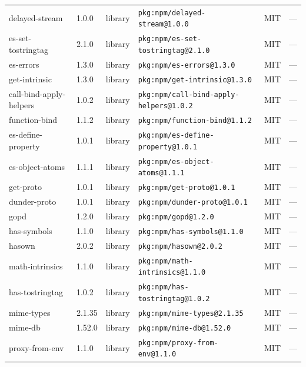 \documentclass[11pt,a4paper]{article}
\begin{document}
\begin{longtable}{|p{4cm}|p{2cm}|p{1.6cm}|p{5cm}|p{1.5cm}|p{3.5cm}|}
\raggedright delayed-stream & 1.0.0 & library & \small\texttt{pkg:npm/delayed-stream@1.0.0} & MIT & \small — \\
\raggedright es-set-tostringtag & 2.1.0 & library & \small\texttt{pkg:npm/es-set-tostringtag@2.1.0} & MIT & \small — \\
\raggedright es-errors & 1.3.0 & library & \small\texttt{pkg:npm/es-errors@1.3.0} & MIT & \small — \\
\raggedright get-intrinsic & 1.3.0 & library & \small\texttt{pkg:npm/get-intrinsic@1.3.0} & MIT & \small — \\
\raggedright call-bind-apply-helpers & 1.0.2 & library & \small\texttt{pkg:npm/call-bind-apply-helpers@1.0.2} & MIT & \small — \\
\raggedright function-bind & 1.1.2 & library & \small\texttt{pkg:npm/function-bind@1.1.2} & MIT & \small — \\
\raggedright es-define-property & 1.0.1 & library & \small\texttt{pkg:npm/es-define-property@1.0.1} & MIT & \small — \\
\raggedright es-object-atoms & 1.1.1 & library & \small\texttt{pkg:npm/es-object-atoms@1.1.1} & MIT & \small — \\
\raggedright get-proto & 1.0.1 & library & \small\texttt{pkg:npm/get-proto@1.0.1} & MIT & \small — \\
\raggedright dunder-proto & 1.0.1 & library & \small\texttt{pkg:npm/dunder-proto@1.0.1} & MIT & \small — \\
\raggedright gopd & 1.2.0 & library & \small\texttt{pkg:npm/gopd@1.2.0} & MIT & \small — \\
\raggedright has-symbols & 1.1.0 & library & \small\texttt{pkg:npm/has-symbols@1.1.0} & MIT & \small — \\
\raggedright hasown & 2.0.2 & library & \small\texttt{pkg:npm/hasown@2.0.2} & MIT & \small — \\
\raggedright math-intrinsics & 1.1.0 & library & \small\texttt{pkg:npm/math-intrinsics@1.1.0} & MIT & \small — \\
\raggedright has-tostringtag & 1.0.2 & library & \small\texttt{pkg:npm/has-tostringtag@1.0.2} & MIT & \small — \\
\raggedright mime-types & 2.1.35 & library & \small\texttt{pkg:npm/mime-types@2.1.35} & MIT & \small — \\
\raggedright mime-db & 1.52.0 & library & \small\texttt{pkg:npm/mime-db@1.52.0} & MIT & \small — \\
\raggedright proxy-from-env & 1.1.0 & library & \small\texttt{pkg:npm/proxy-from-env@1.1.0} & MIT & \small — \\

\end{longtable}
\end{document}
